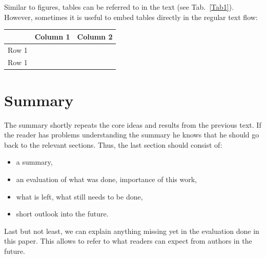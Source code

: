 \documentclass[A4,10pt]{article}
\begin{document}
Similar to figures, tables can be referred to in the text (see 
Tab.~\ref{Tab1}). However, sometimes it is useful to embed tables directly in 
the regular text flow:

\begin{center}
\begin{tabular}{|c|c|c|}
\hline
	& Column 1 & Column 2 \\
\hline
Row 1 & & \\
Row 1 & & \\
\hline
\end{tabular}
\end{center}


\section{Summary}
\label{summary}

The summary shortly repeats the core ideas and results from the
previous text. If the reader has problems understanding the summary
he knows that he should go back to the relevant sections.
Thus, the last section should consist of:

\begin{itemize}
	\item a summary,
	\item an evaluation of what was done, importance of this work,
	\item what is left, what still needs to be done,
	\item short outlook into the future.
\end{itemize}

Last but not least, we can explain anything missing yet in the evaluation
done in this paper. This allows to refer to what readers can expect from
authors in the future.

\nocite{robotron,
stonx,vice,650sim,herculessim,zib,4004,thermal1,thermal2,rojas}




\end{document}
